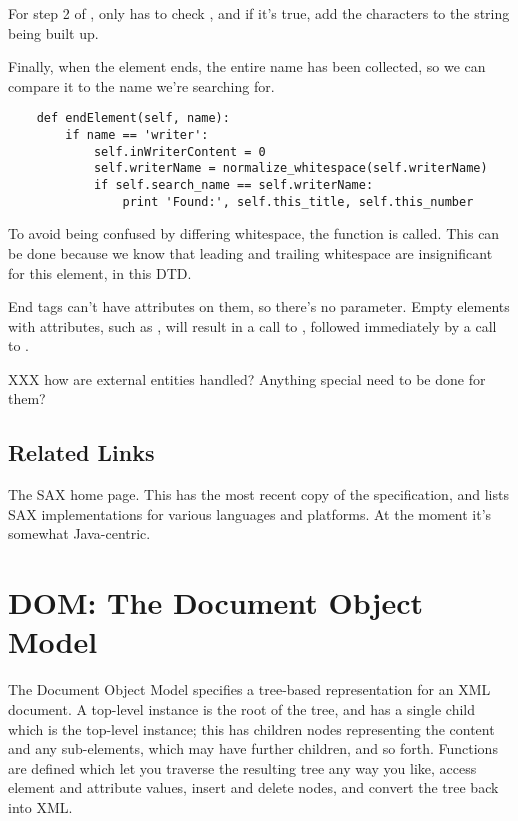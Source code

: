 \documentclass{howto}
\newcommand{\element}[1]{\code{#1}}
\begin{document}
For step 2 of ,  only has to
check , and if it's true, add the characters to
the string being built up.

Finally, when the \element{writer} element ends, the entire name has
been collected, so we can compare it to the name we're searching for.

\begin{verbatim}
    def endElement(self, name):
        if name == 'writer':
            self.inWriterContent = 0
            self.writerName = normalize_whitespace(self.writerName)
            if self.search_name == self.writerName:
                print 'Found:', self.this_title, self.this_number
\end{verbatim}

To avoid being confused by differing whitespace, the
 function is called.  This can be
done because we know that leading and trailing whitespace are
insignificant for this element, in this DTD.  

End tags can't have attributes on them, so there's no 
parameter.  Empty elements with attributes, such as , will result in a call to
, followed immediately by a call to .

XXX how are external entities handled?  Anything special need to be
done for them?

\subsection{Related Links}

\begin{definitions}
%
The SAX home page.  This has the most recent copy of the
specification, and lists SAX implementations for various languages and
platforms.  At the moment it's somewhat Java-centric.

\end{definitions}

\section{DOM: The Document Object Model}
\label{DOM}

The Document Object Model specifies a tree-based representation for an
XML document.  A top-level  instance is the root of
the tree, and has a single child which is the top-level
 instance; this  has children nodes
representing the content and any sub-elements, which may have further
children, and so forth.  Functions are defined which let you traverse
the resulting tree any way you like, access element and attribute
values, insert and delete nodes, and convert the tree back into XML.
\end{document}
